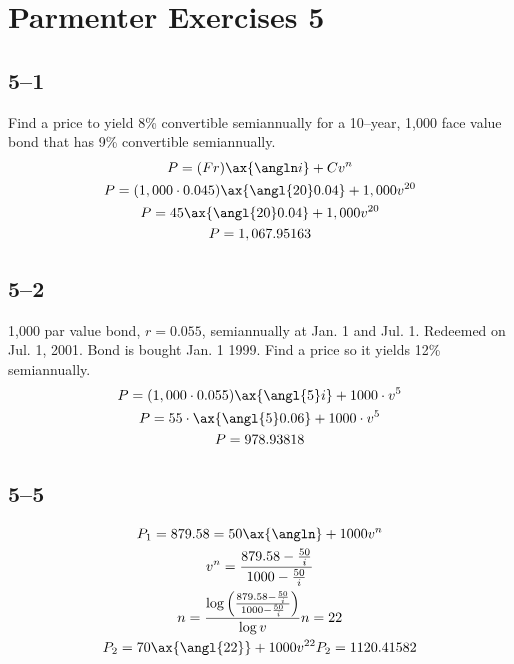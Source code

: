 \documentclass[a4paper, 12pt, reqno]{amsart}
\title{\titl}
\author{Moritz M. Konarski}
\date{\today}
\begin{document}
\maketitle

\section*{Parmenter Exercises 5}

\subsection*{5--1} 

Find a price to yield 8\% convertible semiannually for a 10--year, 1,000 face
value bond that has 9\% convertible semiannually.
\begin{equation}\nonumber
    \begin{gathered}
        P = (Fr)\ax{\angln i} + C v^n   \\
        P = (1,000 \cdot 0.045)\ax{\angl{20} 0.04} + 1,000 v^{20}   \\
        P = 45\ax{\angl{20} 0.04} + 1,000 v^{20}   \\
        P = 1,067.95163
    \end{gathered}
\end{equation}

\subsection*{5--2} 

1,000 par value bond, $r=0.055$, semiannually at Jan. 1 and Jul. 1. Redeemed on
Jul. 1, 2001. Bond is bought Jan. 1 1999. Find a price so it yields 12\%
semiannually.
\begin{equation}\nonumber
    \begin{gathered}
        P = (1,000 \cdot 0.055)\ax{\angl{5} i} + 1000 \cdot v^5 \\
        P = 55 \cdot \ax{\angl{5} 0.06} + 1000 \cdot v^5 \\
        P = 978.93818
    \end{gathered}
\end{equation}

\subsection*{5--5} 

\begin{equation}\nonumber
    \begin{gathered}
        P_1 = 879.58 = 50 \ax{\angln} + 1000 v^n        \\
        v^n = \frac{879.58 - \frac{50}{i}}{1000 - \frac{50}{i}}     \\
        n = \frac{\log \left( \frac{879.58 - \frac{50}{i}}{1000 - \frac{50}{i}}
            \right)}{\log v}
        n = 22      \\
        P_2 = 70 \ax{\angl{22}} + 1000 v^{22}
        P_2 = 1120.41582
    \end{gathered}
\end{equation}
\end{document}
